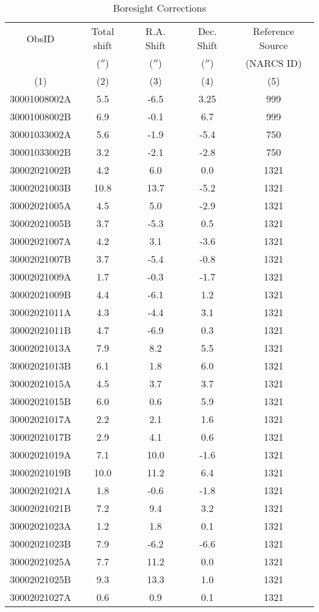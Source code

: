 \documentclass[iop,revtex4]{emulateapj}
\newcommand\T{\rule{0pt}{2.6ex}}       %
\newcommand\B{\rule[-1.2ex]{0pt}{0pt}} %
\begin{document}
\begin{table}
\centering
{\footnotesize
\begin{threeparttable}
\caption{Boresight Corrections}
\begin{tabular}{ccccc} \hline \hline
\T ObsID & Total shift & R.A. Shift & Dec. Shift & Reference Source\\
& ($''$) & ($''$) & ($''$) & (NARCS ID)\\
\B(1) & (2) & (3) & (4) & (5)\\
\hline
\T 30001008002A&5.5&-6.5&3.25&999\\
30001008002B&6.9&-0.1&6.7&999\\
30001033002A&5.6&-1.9&-5.4&750\\
30001033002B&3.2&-2.1&-2.8&750\\
30002021002B&4.2&6.0&0.0&1321\\
30002021003B&10.8&13.7&-5.2&1321\\
30002021005A&4.5&5.0&-2.9&1321\\
30002021005B&3.7&-5.3&0.5&1321\\
30002021007A&4.2&3.1&-3.6&1321\\
30002021007B&3.7&-5.4&-0.8&1321\\
30002021009A&1.7&-0.3&-1.7&1321\\
30002021009B&4.4&-6.1&1.2&1321\\
30002021011A&4.3&-4.4&3.1&1321\\
30002021011B&4.7&-6.9&0.3&1321\\
30002021013A&7.9&8.2&5.5&1321\\
30002021013B&6.1&1.8&6.0&1321\\
30002021015A&4.5&3.7&3.7&1321\\
30002021015B&6.0&0.6&5.9&1321\\
30002021017A&2.2&2.1&1.6&1321\\
30002021017B&2.9&4.1&0.6&1321\\
30002021019A&7.1&10.0&-1.6&1321\\
30002021019B&10.0&11.2&6.4&1321\\
30002021021A&1.8&-0.6&-1.8&1321\\
30002021021B&7.2&9.4&3.2&1321\\
30002021023A&1.2&1.8&0.1&1321\\
30002021023B&7.9&-6.2&-6.6&1321\\
30002021025A&7.7&11.2&0.0&1321\\
30002021025B&9.3&13.3&1.0&1321\\
30002021027A&0.6&0.9&0.1&1321\\

\end{tabular}
\end{threeparttable}}
\end{table}
\end{document}
